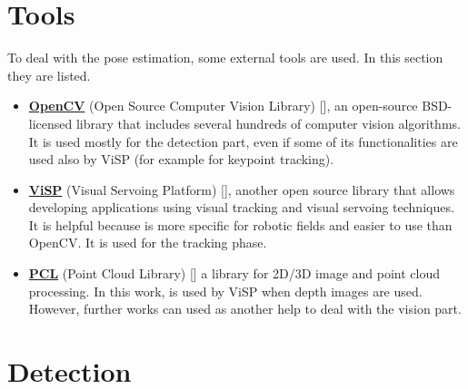\section{Tools}
To deal with the pose estimation, some external tools are used. In this section they are listed.

\begin{itemize}


	\item \href{https://opencv.org/}{\textbf{OpenCV}} (Open Source Computer Vision Library) [\cite{opencv}],  an open-source BSD-licensed library that includes several hundreds of computer vision algorithms. It is used mostly for the detection part, even if some of its functionalities are used also by ViSP (for example for keypoint tracking).
	
	\item \href{https://visp.inria.fr/}{\textbf{ViSP}} (Visual Servoing Platform) [\cite{visp}], another open source library that allows developing applications using visual tracking and visual servoing techniques. It is helpful because is more specific for robotic fields and easier to use than OpenCV. It is used for the tracking phase.
	
	\item \href{http://www.pointclouds.org/}{\textbf{PCL}} (Point Cloud Library) [\cite{pclLib}] a library for 2D/3D image and point cloud processing. In this work, is used by ViSP when depth images are used. However, further works can used as another help to deal with the vision part.
	
\end{itemize}

\section{Detection}
\label{sec:visDetect}

